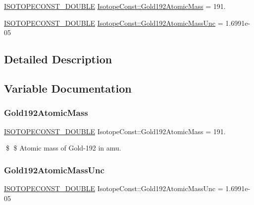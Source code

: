 \begin{DoxyCompactItemize}
\item 
\mbox{\hyperlink{group___isotope_const-_macros_ga8f45a7272ce02c0b4c65c44636ed719a}{I\+S\+O\+T\+O\+P\+E\+C\+O\+N\+S\+T\+\_\+\+D\+O\+U\+B\+LE}} \mbox{\hyperlink{group___isotope_const-_gold-_au192_ga5b1b54243198a6a239105cb296bd5039}{Isotope\+Const\+::\+Gold192\+Atomic\+Mass}} = 191.
\item 
\mbox{\hyperlink{group___isotope_const-_macros_ga8f45a7272ce02c0b4c65c44636ed719a}{I\+S\+O\+T\+O\+P\+E\+C\+O\+N\+S\+T\+\_\+\+D\+O\+U\+B\+LE}} \mbox{\hyperlink{group___isotope_const-_gold-_au192_ga05939cd3476ba72f00e3a30de9591514}{Isotope\+Const\+::\+Gold192\+Atomic\+Mass\+Unc}} = 1.\+6991e-\/05
\end{DoxyCompactItemize}


\subsection{Detailed Description}


\subsection{Variable Documentation}
\mbox{\label{group___isotope_const-_gold-_au192_ga5b1b54243198a6a239105cb296bd5039}} 
\subsubsection{\texorpdfstring{Gold192\+Atomic\+Mass}{Gold192AtomicMass}}
{\footnotesize\ttfamily \mbox{\hyperlink{group___isotope_const-_macros_ga8f45a7272ce02c0b4c65c44636ed719a}{I\+S\+O\+T\+O\+P\+E\+C\+O\+N\+S\+T\+\_\+\+D\+O\+U\+B\+LE}} Isotope\+Const\+::\+Gold192\+Atomic\+Mass = 191.}

\$ \$ Atomic mass of Gold-\/192 in amu. \mbox{\label{group___isotope_const-_gold-_au192_ga05939cd3476ba72f00e3a30de9591514}} 
\subsubsection{\texorpdfstring{Gold192\+Atomic\+Mass\+Unc}{Gold192AtomicMassUnc}}
{\footnotesize\ttfamily \mbox{\hyperlink{group___isotope_const-_macros_ga8f45a7272ce02c0b4c65c44636ed719a}{I\+S\+O\+T\+O\+P\+E\+C\+O\+N\+S\+T\+\_\+\+D\+O\+U\+B\+LE}} Isotope\+Const\+::\+Gold192\+Atomic\+Mass\+Unc = 1.\+6991e-\/05}

